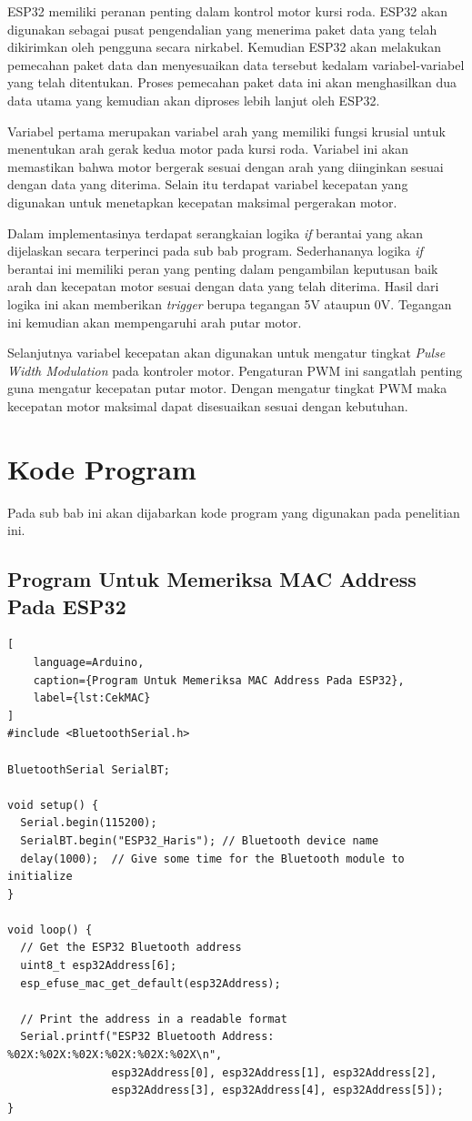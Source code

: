 ESP32 memiliki peranan penting dalam kontrol motor kursi roda. ESP32 akan digunakan sebagai pusat pengendalian yang menerima paket data yang telah dikirimkan oleh pengguna secara nirkabel. Kemudian ESP32 akan melakukan pemecahan paket data dan menyesuaikan data tersebut kedalam variabel-variabel yang telah ditentukan. Proses pemecahan paket data ini akan menghasilkan dua data utama yang kemudian akan diproses lebih lanjut oleh ESP32.

Variabel pertama merupakan variabel arah yang memiliki fungsi krusial untuk menentukan arah gerak kedua motor pada kursi roda. Variabel ini akan memastikan bahwa motor bergerak sesuai dengan arah yang diinginkan sesuai dengan data yang diterima. Selain itu terdapat variabel kecepatan yang digunakan untuk menetapkan kecepatan maksimal pergerakan motor.

Dalam implementasinya terdapat serangkaian logika \emph{if} berantai yang akan dijelaskan secara terperinci pada sub bab program. Sederhananya logika \emph{if} berantai ini memiliki peran yang penting dalam pengambilan keputusan baik arah dan kecepatan motor sesuai dengan data yang telah diterima. Hasil dari logika ini akan memberikan \emph{trigger} berupa tegangan 5V ataupun 0V. Tegangan ini kemudian akan mempengaruhi arah putar motor.

Selanjutnya variabel kecepatan akan digunakan untuk mengatur tingkat \emph{Pulse Width Modulation} pada kontroler motor. Pengaturan PWM ini sangatlah penting guna mengatur kecepatan putar motor. Dengan mengatur tingkat PWM maka kecepatan motor maksimal dapat disesuaikan sesuai dengan kebutuhan.


\section{Kode Program}
Pada sub bab ini akan dijabarkan kode program yang digunakan pada penelitian ini.

\subsection{Program Untuk Memeriksa MAC Address Pada ESP32}


\begin{lstlisting}[
    language=Arduino,
    caption={Program Untuk Memeriksa MAC Address Pada ESP32},
    label={lst:CekMAC}
]
#include <BluetoothSerial.h>

BluetoothSerial SerialBT;

void setup() {
  Serial.begin(115200);
  SerialBT.begin("ESP32_Haris"); // Bluetooth device name
  delay(1000);  // Give some time for the Bluetooth module to initialize
}

void loop() {
  // Get the ESP32 Bluetooth address
  uint8_t esp32Address[6];
  esp_efuse_mac_get_default(esp32Address);

  // Print the address in a readable format
  Serial.printf("ESP32 Bluetooth Address: %02X:%02X:%02X:%02X:%02X:%02X\n",
                esp32Address[0], esp32Address[1], esp32Address[2],
                esp32Address[3], esp32Address[4], esp32Address[5]);
}
    
\end{lstlisting}

